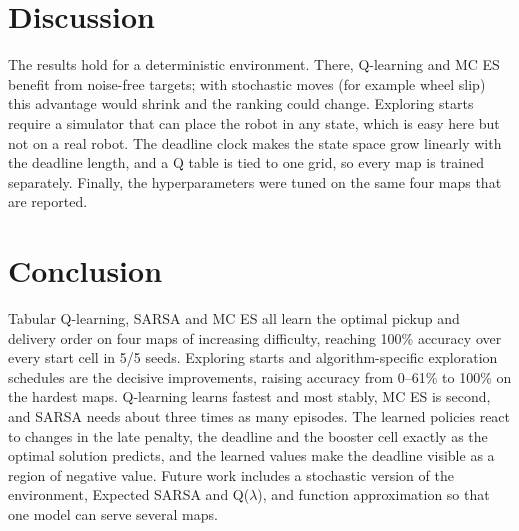 \documentclass[conference]{IEEEtran}
\begin{document}
\section{Discussion}
The results hold for a deterministic environment. There, Q-learning and MC ES benefit from noise-free targets; with stochastic moves (for example wheel slip) this advantage would shrink and the ranking could change. Exploring starts require a simulator that can place the robot in any state, which is easy here but not on a real robot. The deadline clock makes the state space grow linearly with the deadline length, and a Q table is tied to one grid, so every map is trained separately. Finally, the hyperparameters were tuned on the same four maps that are reported.

\section{Conclusion}
Tabular Q-learning, SARSA and MC ES all learn the optimal pickup and delivery order on four maps of increasing difficulty, reaching 100\% accuracy over every start cell in 5/5 seeds. Exploring starts and algorithm-specific exploration schedules are the decisive improvements, raising accuracy from 0--61\% to 100\% on the hardest maps. Q-learning learns fastest and most stably, MC ES is second, and SARSA needs about three times as many episodes. The learned policies react to changes in the late penalty, the deadline and the booster cell exactly as the optimal solution predicts, and the learned values make the deadline visible as a region of negative value. Future work includes a stochastic version of the environment, Expected SARSA and Q($\lambda$), and function approximation so that one model can serve several maps.
\end{document}
